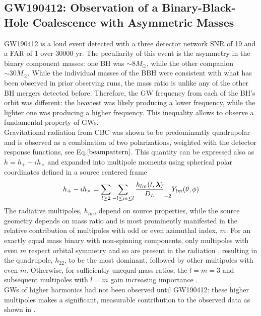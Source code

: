 \documentclass[binding=0.6cm, LaM]{sapthesis}
\begin{document}
\subsection{GW190412: Observation of a Binary-Black-Hole Coalescence with Asymmetric Masses}

	GW190412 is a loud event detected with a three detector network SNR of 19 and a FAR of 1 over 30000 yr.
	The peculiarity of this event is the asymmetry in the binary component masses:
	one BH was $\sim8 M_\odot$, while the other companion $\sim30 M_\odot$.
	While the individual masses of the BBH were consistent with what has been observed in
	prior observing runs, the mass ratio is unlike any of the other BH mergers detected before. 
	Therefore, the GW frequency from each of the BH’s orbit was different: 
	the heaviest was likely producing a lower frequency, while the lighter one was producing a higher frequency.
	This inequality allows to observe a fundamental property of GWs. \\
	Gravitational radiation from CBC was shown to be predominantly quadrupolar \cite{177-179} 
	and is observed as a combination of two polarizations, weighted with the detector response functions, see Eq.$\ref{beampattern}$. 
	This quantity can be expressed also as $h = h_{+}-ih_{\times}$ and expanded into multipole moments 
	using spherical polar coordinates defined in a source centered frame \cite{225}
		\begin{equation}
			h_{+}-ih_{\times} = \sum_{l \geq 2} \sum_{-l \leq m \leq l} {{h_{lm}(t, \boldsymbol{\lambda})} \over {D_L}} _{-2} Y_{lm}(\theta, \phi)
		\end{equation}
	The radiative multipoles, $h_{lm}$, depend on source properties, while the source geometry 
	depends on mass ratio and is most prominently manifested in the relative contribution 
	of multipoles with odd or even azimuthal index, $m$.
	For an exactly equal mass binary with non-spinning components, only multipoles with even $m$ 
	respect orbital symmetry and so are present in the radiation \cite{187}, resulting in the quadrupole, $h_{22}$, 
	to be the most dominant, followed by other multipoles with even $m$. 
	Otherwise, for sufficiently unequal mass ratios, the $l = m = 3$ and subsequent 
	multipoles with $l = m$ gain increasing importance \cite{187-192}. \\
	GWs of higher harmonics had not been observed until GW190412:
	these higher multipoles makes a significant, measurable contribution to the observed data as shown in \cite{133}. \\
\end{document}
